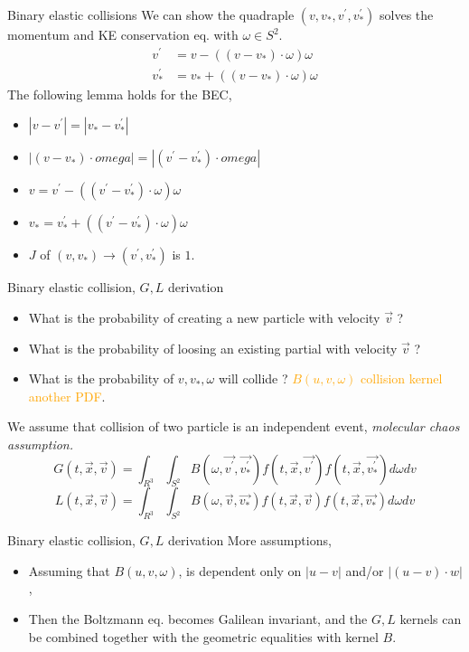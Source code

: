 \documentclass{beamer}
\begin{document}
\begin{frame}{Binary elastic collisions}
    We can show the quadraple $(v,v_*, v^\prime,v_*^\prime)$ solves the momentum and KE conservation eq. with $\omega \in S^2$. 
    \begin{align}
        v^\prime  &= v - ((v-v_*)\cdot \omega)\omega \\
        v_*^\prime  &= v_* + ((v-v_*)\cdot \omega)\omega 
    \end{align} 
The following lemma holds for the BEC, 
\begin{itemize}
    \item $|v-v^\prime| = |v_* - v_*^\prime|$
    \item $|(v-v_*)\cdot omega| = |(v^\prime-v_*^\prime)\cdot omega| $
    \item $v = v^\prime - ((v^\prime-v_*^\prime)\cdot \omega)\omega$
    \item $v_* = v_*^\prime + ((v^\prime-v_*^\prime)\cdot \omega)\omega$
    \item $J$ of $(v,v_*) \rightarrow (v^\prime,v_*^\prime)$ is $1$.
\end{itemize}
\end{frame}

\begin{frame}{Binary elastic collision, $G,L$ derivation}
    \begin{itemize}
        \item What is the probability of creating a new particle with velocity $\vec v$ ?
        \item What is the probability of loosing an existing partial with velocity $\vec v$ ? 
        \item What is the probability of $v,v_*,\omega$ will collide ? \textcolor{orange}{$B(u,v,\omega)$ collision kernel another PDF}. 
    \end{itemize}
We assume that collision of two particle is an independent event, \em{molecular chaos assumption}.
\begin{equation}
    G(t,\vec x, \vec v) = \int_{R^3} \int_{S^2} B(\omega, \vec{v^\prime}, \vec{v_*^\prime}) f(t,\vec x, \vec{v^\prime} ) f(t,\vec x, \vec{ v_*^\prime} ) d\omega dv
\end{equation}
\begin{equation}
    L(t,\vec x, \vec v) = \int_{R^3} \int_{S^2} B(\omega, \vec{v}, \vec{v_*}) f(t,\vec x, \vec{v} ) f(t,\vec x, \vec{ v_*} ) d\omega dv
\end{equation}
\end{frame}

\begin{frame}{Binary elastic collision, $G,L$ derivation}
    More assumptions, 
    \begin{itemize}
        \item Assuming that $B(u,v,\omega)$, is dependent only on $|u-v|$ and/or $|(u-v)\cdot w|$, 
        \item Then the Boltzmann eq. becomes Galilean invariant, and the $G,L$ kernels can be combined together with the geometric equalities with kernel $B$.
    \end{itemize}
\end{frame}


\end{document}
